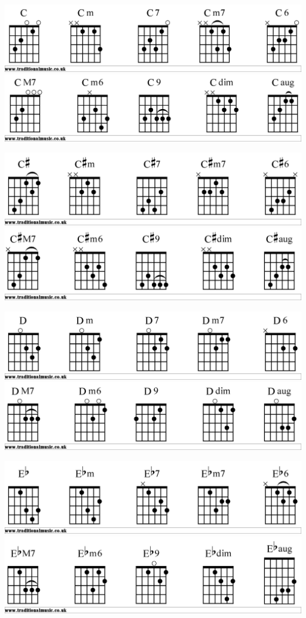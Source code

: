\includegraphics[scale=.15]{Cgtr1}
\includegraphics[scale=.15]{Cgtr2}

\includegraphics[scale=.15]{Csgtr1}
\includegraphics[scale=.15]{Csgtr2}

\includegraphics[scale=.15]{Dgtr1}
\includegraphics[scale=.15]{Dgtr2}

\includegraphics[scale=.15]{Ebgtr1}
\includegraphics[scale=.15]{Ebgtr2}

